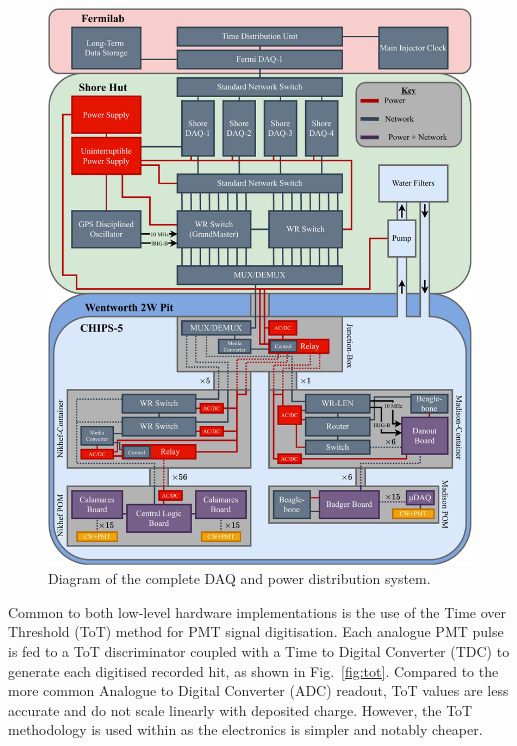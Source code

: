 \begin{figure} %
    \includegraphics[width=\textwidth]{diagrams/5-daq/daq.pdf}
    \caption[Diagram of the complete \chipsfive data acquisition and power distribution system]
    {Diagram of the complete \chipsfive DAQ and power distribution system.}
    \label{fig:daq}
\end{figure}

Common to both low-level hardware implementations is the use of the Time over Threshold (ToT)
method for PMT signal digitisation. Each analogue PMT pulse is fed to a ToT discriminator coupled
with a Time to Digital Converter (TDC) to generate each digitised recorded hit, as shown in
Fig.~\ref{fig:tot}. Compared to the more common Analogue to Digital Converter (ADC) readout, ToT
values are less accurate and do not scale linearly with deposited charge. However, the ToT
methodology is used within \chips as the electronics is simpler and notably cheaper.

